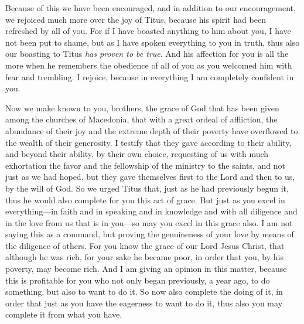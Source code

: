 \begin{biblechapter}
\verse Because of this we have been encouraged, and in addition to our encouragement, we rejoiced much more over the joy of Titus, because his spirit had been refreshed by all of you.
\verse For if I have boasted anything to him about you, I have not been put to shame, but as I have spoken everything to you in truth, thus also our boasting to Titus \textit{has proven to be true}.
\verse And his affection for you is all the more when he remembers the obedience of all of you as you welcomed him with fear and trembling.
\verse I rejoice, because in everything I am completely confident in you.
\end{biblechapter}

\begin{biblechapter} %
 Now we make known to you, brothers, the grace of God that has been given among the churches of Macedonia,
\verse that with a great ordeal of affliction, the abundance of their joy and the extreme depth of their poverty have overflowed to the wealth of their generosity.
\verse I testify that they gave according to their ability, and beyond their ability, by their own choice,
\verse requesting of us with much exhortation the favor and the fellowship of the ministry to the saints,
\verse and not just as we had hoped, but they gave themselves first to the Lord and then to us, by the will of God.
\verse So we urged Titus that, just as he had previously begun it, thus he would also complete for you this act of grace.
\verse But just as you excel in everything—in faith and in speaking and in knowledge and with all diligence and in the love from us that is in you—so may you excel in this grace also.
\verse I am not saying this as a command, but proving the genuineness of your love by means of the diligence of others.
\verse For you know the grace of our Lord Jesus Christ, that although he was rich, for your sake he became poor, in order that you, by his poverty, may become rich.
\verse And I am giving an opinion in this matter, because this is profitable for you who not only began previously, a year ago, to do something, but also to want to do it.
\verse So now also complete the doing of it, in order that just as you have the eagerness to want to do it, thus also you may complete it from what you have.

\end{biblechapter}
